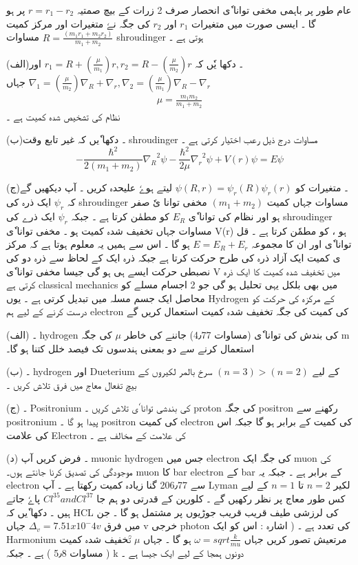 عام طور پر  باہمی مخفی توانا ٗی انحصار صرف 2 زرات کے بیچ صمتیہ
$ r = r_1 - r_2 $
پر ہو گا ۔ ایسی صورت میں متغیرات 
$ r_1  $
اور 
$  r_2  $
کی جگہ نےٗ متغیرات  اور مرکز کمیت
$  R = \frac{ ( m_1 r_1 + m_2 r_2 ) }{ m_1 + m_2 } $
مساوات shroudinger ہوتی ہے ۔ 


(الف)۔  دکھا یٗں کہ 
$ r_1 = R + (\frac{ \mu}{m_1} )r , r_2 = R - (\frac{ \mu }{ m_2 } )r   $ 
اور 
$ \nabla_1 = ( \frac{ \mu }{ m_2 } )\nabla_R + \nabla_r , \nabla_2 = ( \frac{ \mu }{ m_1 } ) \nabla_R - \nabla_r $ 
جہاں 
\begin{align}
\mu = \frac{ m_1 m_2 }{ m_1 + m_2 }
\end{align}
نظام کی تشخیص شدہ کمیت ہے ۔
 
(ب)۔ دکھا ٗیں کہ غیر تابع وقت shroudinger  مساوات درج ذیل رعب اختیار کرتی ہے ۔
\[
- \frac{ \hbar^2 }{ 2 ( m_1 + m_2 ) } { \nabla_R }^2  \psi - \frac{ \hbar^2 }{ 2 \mu } { \nabla_r }^2 { \psi } + V(r) \psi = E \psi
\]

(ج)۔ متغیرات کو 
$ \psi ( R , r ) = { \psi_r }(R) { \psi_r } (r) $
لیتے ہوےٗ علیحدہ کریں ۔ آپ دیکھیں گے کہ 
$ \psi_r $
 ایک ذرہ کی shroudinger مساوات جہاں کمیت 
$ ( m_1 + m_2 ) $
مخفی توانا یٗ صفر ہو اور نظام کی توانا ٗی 
$ E_R $
کو مطمٰن کرتا ہے ۔ جبکہ 
$ \psi_r $
ایک ذرے کی shroudinger مساوات جہاں تخفیف شدہ کمیت ہو ۔  مخفی توانا ٗی  V(r) ہو ، کو مطمٗن کرتا ہے ۔ قل توانا ٗی اور ان کا مجموعہ 
$ E = E_R + E_r $
ہو گا ۔ اس سے ہمیں یہ معلوم ہوتا ہے  کہ مرکز ی کمیت ایک آزاد ذرہ کی طرح حرکت کرتا ہے جبکہ ذرہ ایک کے لحاظ سے ذرہ دو کی  نصبطی حرکت ایسے ہی ہو گی جیسا مخفی توانا ٗی V میں تخفیف شدہ کمیت کا ایک ذرہ  کرتی ہے classical mechanics میں بھی بلکل یہی تحلیل ہو گی    جو 2 اجسام مسلے کو محاصل ایک جسم مسلہ میں  تبدیل کرتی ہے ۔ 
 یوں Hydrogen کے مرکزہ کی حرکت کو درست کرنے کے لیے ہم electron  کی کمیت کی جگہ تخفیف شدہ کمیت استعمال کریں گے 

(الف) ۔ hydrogen کی بندش کی توانا ٗی (مساوات 4٫77) جاننے کی خاطر 
$ \mu $
کی جگہ m استعمال کرنے سے  دو بمعنی ہندسوں تک فیصد خلل کتنا ہو گا۔  

(ب) ۔ hydrogen اور Dueterium کے لیے 
$ ( n=3 ) > ( n=2 ) $ 
 سرخ بالمر لکیروں کے بیچ تفعال معاج میں فرق تلاش کریں ۔ 

(ج) ۔ Positronium کی بندشی توانا ٗی تلاش کریں ۔ proton کی جگہ  positron رکھنے سے positronium پیدا ہو گا ۔ positron کی کمیت electron کی کمیت کے برابر ہو گا جبکہ اس کی علامت Electron کی علامت کے مخالف ہے ۔ 

(د) ۔ فرض کریں آپ muonic hydrogen  جس میں electron کی جگہ ایک muon کی موجودگی کی تصدیق کرنا جانتے ہوں۔ muon کا bar  electron کے bar  کے برابر ہے ۔ جبکہ یہ electron سے 206٫77 گنا زیادہ  کمیت رکھتا ہے ۔  آپ Lyman    لکیر  
$ n = 2 $
تا 
$ n = 1 $
کے لیے کس طور معاج پر نظر رکھیں گے ۔ 
کلورین کے قدرتی دو ہم جا 
$ Cl^35 and Cl^37 $ 
پاےٗ جاتے ہیں ۔ دکھا ٗیں کہ HCL کی لرزشی طیف قریب قریب   جوڑیوں پر مشتمل ہو گا ۔ جن میں فرق 
$ \Delta_v = 7.51 x {10}^-4 v $
جہاں v خرجی photon کی تعدد ہے ۔  ( اشارہ : اس کو ایک Harmonium مرتعیش تصور کریں جہاں 
$ \omega = sqrt{ \frac{ k }{ mu} } $
ہو گا ۔ جہاں 
$ \mu $
تؒخفیف شدہ کمیت ( مساوات 5٫8 ) ہے ۔ جبکہ k دونوں ہمجا کے لیے ایک جیسا ہے ۔ 

